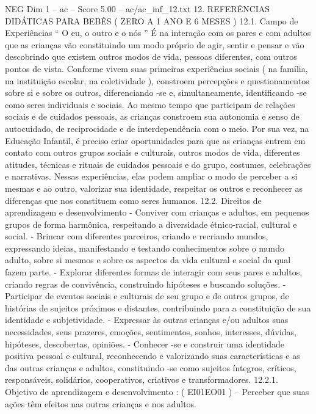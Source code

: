 \begin{textsample}{NEG Dim 1 – ac – Score 5.00 – ac/ac\_inf\_12.txt}  \label{ex:f1_neg_119}
12.
REFERÊNCIAS DIDÁTICAS PARA BEBÊS ( ZERO A 1 ANO E 6 MESES ) 12.1.
Campo de Experiências “ O eu, o outro e o nós ” É na interação com os pares e com adultos que as crianças vão constituindo um modo próprio de agir, sentir e pensar e vão descobrindo que existem outros modos de vida, pessoas diferentes, com outros pontos de vista.
Conforme vivem suas primeiras experiências sociais ( na família, na instituição escolar, na coletividade ), constroem percepções e questionamentos sobre si e sobre os outros, diferenciando -se e, simultaneamente, identificando -se como seres individuais e sociais.
Ao mesmo tempo que participam de relações sociais e de cuidados pessoais, as crianças constroem sua autonomia e senso de autocuidado, de reciprocidade e de interdependência com o meio.
Por sua vez, na Educação Infantil, é preciso criar oportunidades para que as crianças entrem em contato com outros grupos sociais e culturais, outros modos de vida, diferentes atitudes, técnicas e rituais de cuidados pessoais e do grupo, costumes, celebrações e narrativas.
Nessas experiências, elas podem ampliar o modo de perceber a si mesmas e ao outro, valorizar sua identidade, respeitar os outros e reconhecer as diferenças que nos constituem como seres humanos. 12.2.
Direitos de aprendizagem e desenvolvimento - Conviver com crianças e adultos, em pequenos grupos de forma harmônica, respeitando a diversidade étnico-racial, cultural e social. - Brincar com diferentes parceiros, criando e recriando mundos, expressando ideias, manifestando e testando conhecimentos sobre o mundo adulto, sobre si mesmos e sobre os aspectos da vida cultural e social da qual fazem parte. - Explorar diferentes formas de interagir com seus pares e adultos, criando regras de convivência, construindo hipóteses e buscando soluções. - Participar de eventos sociais e culturais de seu grupo e de outros grupos, de histórias de sujeitos próximos e distantes, contribuindo para a constituição de sua identidade e subjetividade. - Expressar às outras crianças e/ou adultos suas necessidades, seus prazeres, emoções, sentimentos, sonhos, interesses, dúvidas, hipóteses, descobertas, opiniões. - Conhecer -se e construir uma identidade positiva pessoal e cultural, reconhecendo e valorizando suas características e as das outras crianças e adultos, constituindo -se como sujeitos íntegros, críticos, responsáveis, solidários, cooperativos, criativos e transformadores. 12.2.1.
Objetivo de aprendizagem e desenvolvimento : ( EI01EO01 ) – Perceber que suas ações têm efeitos nas outras crianças e nos adultos.

\end{textsample}

